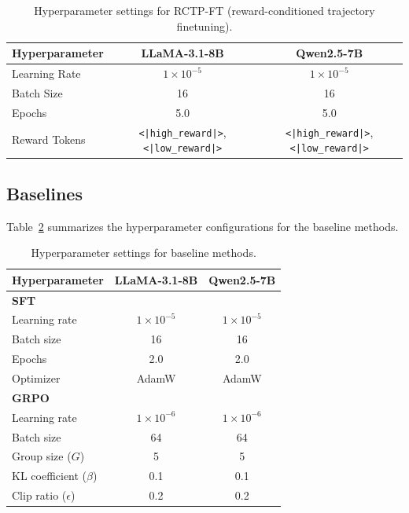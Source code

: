 \documentclass{article}
\theoremstyle{plain}
\theoremstyle{definition}
\theoremstyle{remark}
\begin{document}
\begin{table}[h]
    \centering
    \caption{Hyperparameter settings for RCTP-FT (reward-conditioned trajectory finetuning).}
    \label{tab:rctp_ft_settings}
    \begin{tabular}{lcc}
        \toprule
        \textbf{Hyperparameter} & \textbf{LLaMA-3.1-8B} & \textbf{Qwen2.5-7B} \\
        \midrule
        Learning Rate & $1 \times 10^{-5}$ & $1 \times 10^{-5}$ \\
        Batch Size & 16 & 16 \\
        Epochs & 5.0 & 5.0 \\
        Reward Tokens & \texttt{<|high\_reward|>}, \texttt{<|low\_reward|>} & \texttt{<|high\_reward|>}, \texttt{<|low\_reward|>} \\
        \bottomrule
    \end{tabular}
\end{table}

\subsection{Baselines}

Table~\ref{tab:baseline_settings} summarizes the hyperparameter configurations for the baseline methods.

\begin{table}[h]
    \centering
    \caption{Hyperparameter settings for baseline methods.}
    \label{tab:baseline_settings}
    \begin{tabular}{lcc}
        \toprule
        \textbf{Hyperparameter} & \textbf{LLaMA-3.1-8B} & \textbf{Qwen2.5-7B} \\
        \midrule
        \multicolumn{3}{l}{\textbf{SFT}} \\
        Learning rate & $1 \times 10^{-5}$ & $1 \times 10^{-5}$ \\
        Batch size & 16 & 16 \\
        Epochs & 2.0 & 2.0 \\
        Optimizer & AdamW & AdamW \\
        \midrule
        \multicolumn{3}{l}{\textbf{GRPO}} \\
        Learning rate & $1 \times 10^{-6}$ & $1 \times 10^{-6}$ \\
        Batch size & 64 & 64 \\
        Group size ($G$) & 5 & 5 \\
        KL coefficient ($\beta$) & 0.1 & 0.1 \\
        Clip ratio ($\epsilon$) & 0.2 & 0.2 \\
        \bottomrule
    \end{tabular}
\end{table}


\end{document}
